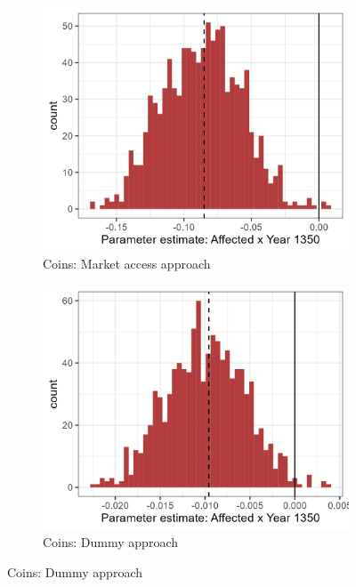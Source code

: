 \begin{figure}[h!]
    \centering
    \caption{Distribution of parameter estimates in 1350  (matched sample)}
    \begin{subfigure}[b]{0.45\textwidth}
        \centering
        \caption{\label{fig:distri_a} Coins: Market access approach}
        \includegraphics[width=\textwidth]{Plots/Regression_plots/arch_MA_coins_matched_boot_norm.png}
    \end{subfigure}
    \hfill
    \begin{subfigure}[b]{0.45\textwidth}
        \centering
        \caption{\label{fig:distri_b} Coins: Dummy approach}
        \includegraphics[width=\textwidth]{Plots/Regression_plots/arch_dummy_coins_matched_boot_norm.png}

\end{subfigure}
\end{figure}
